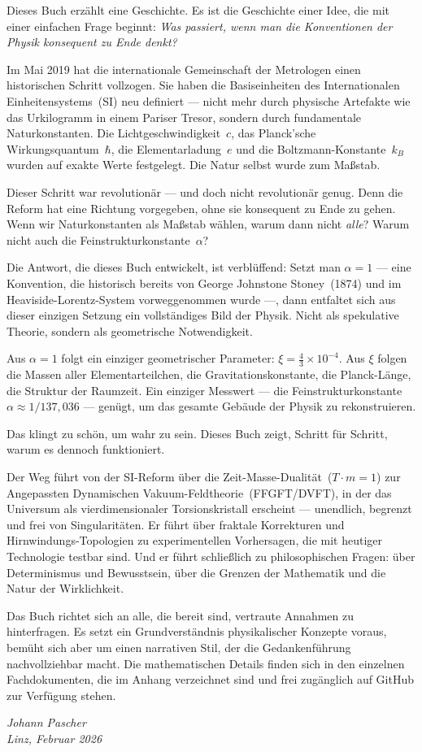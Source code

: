Dieses Buch erzählt eine Geschichte. Es ist die Geschichte einer Idee, die mit einer einfachen Frage beginnt: \emph{Was passiert, wenn man die Konventionen der Physik konsequent zu Ende denkt?}

Im Mai 2019 hat die internationale Gemeinschaft der Metrologen einen historischen Schritt vollzogen. Sie haben die Basiseinheiten des Internationalen Einheitensystems~(SI) neu definiert --- nicht mehr durch physische Artefakte wie das Urkilogramm in einem Pariser Tresor, sondern durch fundamentale Naturkonstanten. Die Lichtgeschwindigkeit~$c$, das Planck'sche Wirkungsquantum~$\hbar$, die Elementarladung~$e$ und die Boltzmann-Konstante~$k_B$ wurden auf exakte Werte festgelegt. Die Natur selbst wurde zum Maßstab.

Dieser Schritt war revolutionär --- und doch nicht revolutionär genug. Denn die Reform hat eine Richtung vorgegeben, ohne sie konsequent zu Ende zu gehen. Wenn wir Naturkonstanten als Maßstab wählen, warum dann nicht \emph{alle}? Warum nicht auch die Feinstrukturkonstante~$\alpha$?

Die Antwort, die dieses Buch entwickelt, ist verblüffend: Setzt man $\alpha = 1$ --- eine Konvention, die historisch bereits von George Johnstone Stoney~(1874) und im Heaviside-Lorentz-System vorweggenommen wurde ---, dann entfaltet sich aus dieser einzigen Setzung ein vollständiges Bild der Physik. Nicht als spekulative Theorie, sondern als geometrische Notwendigkeit.

Aus $\alpha = 1$ folgt ein einziger geometrischer Parameter: $\xi = \tfrac{4}{3} \times 10^{-4}$. Aus $\xi$ folgen die Massen aller Elementarteilchen, die Gravitationskonstante, die Planck-Länge, die Struktur der Raumzeit. Ein einziger Messwert --- die Feinstrukturkonstante~$\alpha \approx 1/137{,}036$ --- genügt, um das gesamte Gebäude der Physik zu rekonstruieren.

Das klingt zu schön, um wahr zu sein. Dieses Buch zeigt, Schritt für Schritt, warum es dennoch funktioniert.

Der Weg führt von der SI-Reform über die Zeit-Masse-Dualität~($T \cdot m = 1$) zur Angepassten Dynamischen Vakuum-Feldtheorie~(FFGFT/DVFT), in der das Universum als vierdimensionaler Torsionskristall erscheint --- unendlich, begrenzt und frei von Singularitäten. Er führt über fraktale Korrekturen und Hirnwindungs-Topologien zu experimentellen Vorhersagen, die mit heutiger Technologie testbar sind. Und er führt schließlich zu philosophischen Fragen: über Determinismus und Bewusstsein, über die Grenzen der Mathematik und die Natur der Wirklichkeit.

Das Buch richtet sich an alle, die bereit sind, vertraute Annahmen zu hinterfragen. Es setzt ein Grundverständnis physikalischer Konzepte voraus, bemüht sich aber um einen narrativen Stil, der die Gedankenführung nachvollziehbar macht. Die mathematischen Details finden sich in den einzelnen Fachdokumenten, die im Anhang verzeichnet sind und frei zugänglich auf GitHub zur Verfügung stehen.

\begin{flushright}
\textit{Johann Pascher}\\
\textit{Linz, Februar 2026}
\end{flushright}
